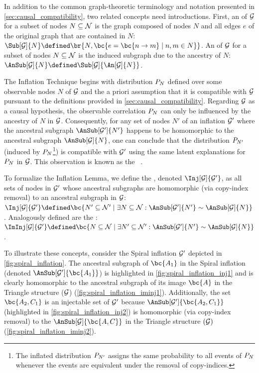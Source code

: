 \documentclass[aps, 10pt, english, twoside, pra, nofootinbib, tightenlines, longbibliography, superscriptaddress]{revtex4-1}
\begin{document}
    In addition to the common graph-theoretic terminology and notation presented in \cref{sec:causal_compatibility}, two related concepts need introductions. First, an  of $\mathcal{G}$ for a subset of nodes $N \subseteq \mathcal{N}$ is the graph composed of nodes $N$ and all edges $e$ of the original graph that are contained in $N$: $\Sub[\graph]{N} \defined \br{N, \bc{e = \bc{n \to m} \mid n, m \in N}}$. An  of $\mathcal{G}$ for a subset of nodes $N \subseteq \mathcal{N}$ is the induced subgraph due to the ancestry of $N$: $\AnSub[\graph]{N} \defined \Sub[\graph]{\An[\graph]{N}}$.

    The Inflation Technique begins with distribution $\prob[N]$ defined over some observable nodes $N$ of $\mathcal{G}$ and the a priori assumption that it is compatible with $\mathcal{G}$ pursuant to the definitions provided in \cref{sec:causal_compatibility}. Regarding $\mathcal{G}$ as a causal hypothesis, the observable correlation $\prob[N]$ can only be influenced by the ancestry of $N$ in $\mathcal{G}$. Consequently, for any set of nodes $N'$ of an inflation $\mathcal{G}'$ where the ancestral subgraph $\AnSub[\graph']{N'}$ happens to be homomorphic to the ancestral subgraph $\AnSub[\graph]{N}$, one can conclude that the distribution $\prob[N']$ (induced by $\prob[N]$\footnote{The inflated distribution $\prob[N']$ assigns the same probability to all events of $\prob[N]$ whenever the events are equivalent under the removal of copy-indices.}) is compatible with $\mathcal{G}'$ using the same latent explanations for $\prob[N]$ in $\mathcal{G}$. This observation is known as the ~\cite[Lemma 3]{Inflation}.

    To formalize the Inflation Lemma, we define the , denoted $\Inj[\graph]{\graph'}$, as all sets of nodes in $\mathcal{G}'$ whose ancestral subgraphs are homomorphic (via copy-index removal) to an ancestral subgraph in $\mathcal{G}$: $\Inj[\graph]{\graph'} \defined \bc{N' \subseteq \nodes' \mid \exists N \subseteq \nodes : \AnSub[\graph']{N'} \sim \AnSub[\graph]{N}}$. Analogously defined are the : $\ImInj[\graph]{\graph'} \defined \bc{N \subseteq \nodes \mid \exists N' \subseteq \nodes' : \AnSub[\graph']{N'} \sim \AnSub[\graph]{N}}$.

    To illustrate these concepts, consider the Spiral inflation $\mathcal{G}'$ depicted in \cref{fig:spiral_inflation}. The ancestral subgraph of $\bc{A_1}$ in the Spiral inflation (denoted $\AnSub[\graph']{\bc{A_1}}$) is highlighted in \cref{fig:spiral_inflation_inj1} and is clearly homomorphic to the ancestral subgraph of its image $\bc{A}$ in the Triangle structure ($\mathcal{G}$) (\cref{fig:spiral_inflation_iminj1}). Additionally, the set $\bc{A_2, C_1}$ is an injectable set of $\mathcal{G}'$ because $\AnSub[\graph']{\bc{A_2, C_1}}$ (highlighted in \cref{fig:spiral_inflation_inj2}) is homomorphic (via copy-index removal) to the $\AnSub[\graph]{\bc{A, C}}$ in the Triangle structure $(\mathcal{G})$ (\cref{fig:spiral_inflation_iminj2}).
\end{document}
